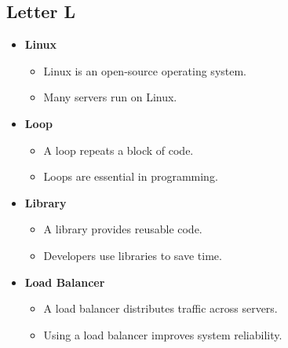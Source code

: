 \subsection{Letter L}
\begin{itemize}
    \item \textbf{Linux}
    \begin{itemize}
        \item Linux is an open-source operating system.
        \item Many servers run on Linux.
    \end{itemize}
    \item \textbf{Loop}
    \begin{itemize}
        \item A loop repeats a block of code.
        \item Loops are essential in programming.
    \end{itemize}
    \item \textbf{Library}
    \begin{itemize}
        \item A library provides reusable code.
        \item Developers use libraries to save time.
    \end{itemize}
    \item \textbf{Load Balancer}
    \begin{itemize}
        \item A load balancer distributes traffic across servers.
        \item Using a load balancer improves system reliability.
    \end{itemize}
\end{itemize}
